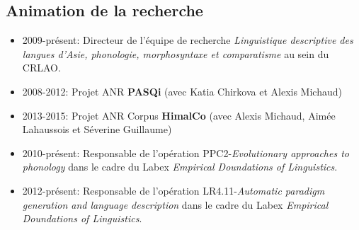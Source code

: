 \documentclass[oldfontcommands,oneside,a4paper,11pt]{article}
\begin{document}
\subsection*{Animation de la recherche}
\begin{itemize}
\item 2009-présent: Directeur de l'équipe de recherche \textit{Linguistique descriptive des langues d’Asie, phonologie, morphosyntaxe et comparatisme} au sein du CRLAO.
\item 2008-2012: Projet ANR \textbf{PASQi} (avec Katia Chirkova et Alexis Michaud)
\item  2013-2015: Projet ANR Corpus \textbf{HimalCo} (avec Alexis Michaud, Aimée Lahaussois et Séverine Guillaume)
\item 2010-présent: Responsable de l'opération PPC2-\textit{Evolutionary approaches to phonology} dans le cadre du Labex \textit{Empirical Doundations of Linguistics}.
\item 2012-présent: Responsable de l'opération LR4.11-\textit{Automatic paradigm generation and language description} dans le cadre du Labex \textit{Empirical Doundations of Linguistics}.

\end{itemize}
  
\end{document}

